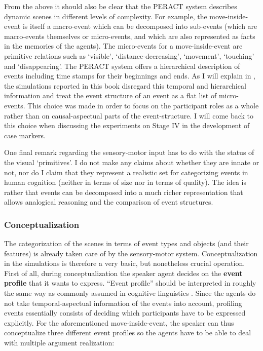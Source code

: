 \largerpage
From the above it should also be clear that the PERACT system describes dynamic scenes in different levels of complexity. For example, the move-inside-event is itself a macro-event which can be decomposed into sub-events (which are macro-events themselves or micro-events, and which are also represented as facts in the memories of the agents). The micro-events for a move-inside-event are primitive relations such as `visible', `distance-decreasing', `movement', `touching' and `disappearing'. The PERACT system offers a hierarchical description of events including time stamps for their beginnings and ends. As I will explain in , the simulations reported in this book disregard this temporal and hierarchical information and treat the event structure of an event as a flat list of micro-events. This choice was made in order to focus on the participant roles as a whole rather than on causal-aspectual parts of the event-structure. I will come back to this choice when discussing the experiments on Stage IV in the development of case markers.

One final remark regarding the sensory-motor input has to do with the status of the visual `primitives'. I do not make any claims about whether they are innate or not, nor do I claim that they represent a realistic set for categorizing events in human cognition (neither in terms of size nor in terms of quality). The idea is rather that events can be decomposed into a much richer representation that allows analogical reasoning and the comparison of event structures.


\subsubsection{Conceptualization}
 The categorization of the scenes in terms of event types and objects (and their features) is already taken care of by the sensory-motor system. Conceptualization in the simulations is therefore a very basic, but nonetheless crucial operation. First of all, during conceptualization the speaker agent decides on the {\bfseries event profile} that it wants to express. ``Event profile'' should be interpreted in roughly the same way as commonly assumed in cognitive linguistics \citep[see for instance][]{croft98event}. Since the agents do not take temporal-aspectual information of the events into account, profiling events essentially consists of deciding which participants have to be expressed explicitly. For the aforementioned move-inside-event, the speaker can thus conceptualize three different event profiles so the agents have to be able to deal with multiple argument realization:

